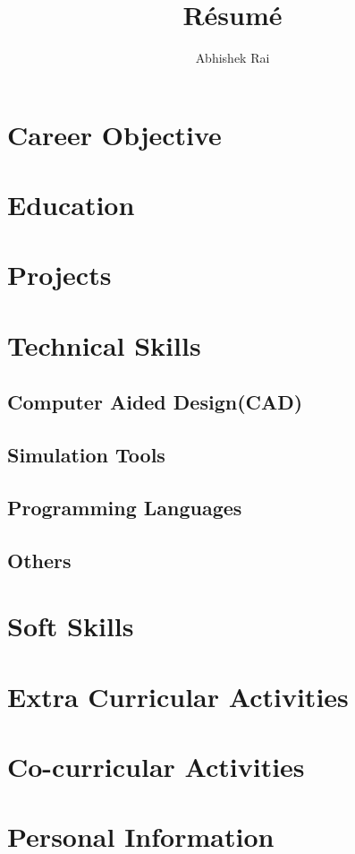 \documentclass{article}
\begin{document}
	\title{R\'esum\'e}
	\author{Abhishek Rai}
	\maketitle
	\section{Career Objective}
	\section{Education}
	\section{Projects}
	\section{Technical Skills}
	\subsection{Computer Aided Design(CAD)}
	\subsection{Simulation Tools}
	\subsection{Programming Languages}
	\subsection{Others}
	
	
	\section{Soft Skills}
	\section{Extra Curricular Activities}
	\section{Co-curricular Activities}
	\section{Personal Information}
	
\end{document}
